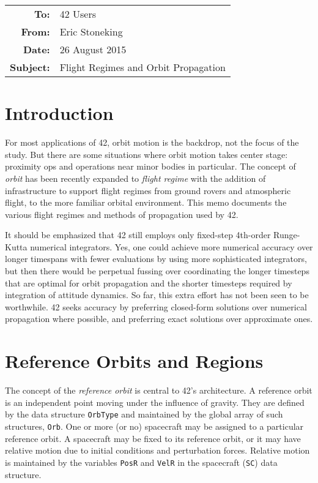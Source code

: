 \documentclass[12pt]{article}
\begin{document}
\begin{tabular}{@{} rl @{}}
    {\bf To:} & 42 Users \\ 
    {\bf From:} & Eric Stoneking \\ 
    {\bf Date:} &  26 August 2015\\ 
    {\bf Subject:} & Flight Regimes and Orbit Propagation \\ 
\hline
\end{tabular}
  
  
\section{Introduction}

For most applications of 42, orbit motion is the backdrop, not the focus of the study.  But there are some situations where orbit motion takes center stage: proximity ops and operations near minor bodies in particular.  The concept of {\em orbit} has been recently expanded to {\em flight regime} with the addition of infrastructure to support flight regimes from ground rovers and atmospheric flight, to the more familiar orbital environment.  This memo  documents the various flight regimes and methods of propagation used by 42.

It should be emphasized that 42 still employs only fixed-step 4th-order Runge-Kutta numerical integrators.  Yes, one could achieve more numerical accuracy over longer timespans with fewer evaluations by using more sophisticated integrators, but then there would be perpetual fussing over coordinating the longer timesteps that are optimal for orbit propagation and the shorter timesteps required by integration of attitude dynamics.  So far, this extra effort has not been seen to be worthwhile.  42 seeks accuracy by preferring closed-form solutions over numerical propagation where possible, and preferring exact solutions over approximate ones.

\section{Reference Orbits and Regions}

The concept of the {\em reference orbit} is central to 42's architecture.  A reference orbit is an independent point moving under the influence of gravity.  They are defined by the data structure {\tt OrbType} and maintained by the global array of such structures, {\tt Orb}.  One or more (or no) spacecraft may be assigned to a particular reference orbit.  A spacecraft may be fixed to its reference orbit, or it may have relative motion due to initial conditions and perturbation forces.  Relative motion is maintained by the variables {\tt PosR} and {\tt VelR} in the spacecraft ({\tt SC}) data structure.
\end{document}

